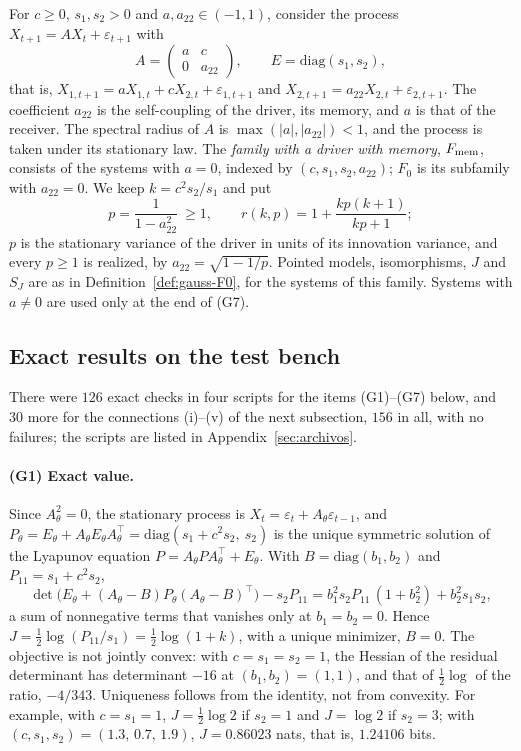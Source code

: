 \begin{definition}\label{def:gauss-Fmem}
For $c\ge0$, $s_1,s_2>0$ and $a,a_{22}\in(-1,1)$, consider the process $X_{t+1}=AX_t+\varepsilon_{t+1}$ with
\[
A=\begin{pmatrix}a&c\\0&a_{22}\end{pmatrix},\qquad E=\mathrm{diag}(s_1,s_2),
\]
that is, $X_{1,t+1}=aX_{1,t}+cX_{2,t}+\varepsilon_{1,t+1}$ and $X_{2,t+1}=a_{22}X_{2,t}+\varepsilon_{2,t+1}$. The coefficient $a_{22}$ is the self-coupling of the driver, its memory, and $a$ is that of the receiver. The spectral radius of $A$ is $\max(|a|,|a_{22}|)<1$, and the process is taken under its stationary law. The \emph{family with a driver with memory}, $F_{\rm mem}$, consists of the systems with $a=0$, indexed by $(c,s_1,s_2,a_{22})$; $F_0$ is its subfamily with $a_{22}=0$. We keep $k=c^2s_2/s_1$ and put
\[
p=\frac1{1-a_{22}^2}\ \ge1,\qquad r(k,p)=1+\frac{kp(k+1)}{kp+1};
\]
$p$ is the stationary variance of the driver in units of its innovation variance, and every $p\ge1$ is realized, by $a_{22}=\sqrt{1-1/p}$. Pointed models, isomorphisms, $J$ and $S_J$ are as in Definition~\ref{def:gauss-F0}, for the systems of this family. Systems with $a\ne0$ are used only at the end of (G7).
\end{definition}

\subsection{Exact results on the test bench}
There were $126$ exact checks in four scripts for the items (G1)--(G7) below, and $30$ more for the connections (i)--(v) of the next subsection, $156$ in all, with no failures; the scripts are listed in Appendix~\ref{sec:archivos}.

\paragraph{(G1) Exact value.} Since $A_\theta^2=0$, the stationary process is $X_t=\varepsilon_t+A_\theta\varepsilon_{t-1}$, and $P_\theta=E_\theta+A_\theta E_\theta A_\theta^\top=\mathrm{diag}(s_1+c^2s_2,\ s_2)$ is the unique symmetric solution of the Lyapunov equation $P=A_\theta PA_\theta^\top+E_\theta$. With $B=\mathrm{diag}(b_1,b_2)$ and $P_{11}=s_1+c^2s_2$,
\begin{equation}
\det\bigl(E_\theta+(A_\theta-B)P_\theta(A_\theta-B)^\top\bigr)-s_2P_{11}=b_1^2s_2P_{11}\,(1+b_2^2)+b_2^2s_1s_2 ,
\end{equation}
a sum of nonnegative terms that vanishes only at $b_1=b_2=0$. Hence $J=\tfrac12\log(P_{11}/s_1)=\tfrac12\log(1+k)$, with a unique minimizer, $B=0$. The objective is not jointly convex: with $c=s_1=s_2=1$, the Hessian of the residual determinant has determinant $-16$ at $(b_1,b_2)=(1,1)$, and that of $\tfrac12\log$ of the ratio, $-4/343$. Uniqueness follows from the identity, not from convexity. For example, with $c=s_1=1$, $J=\tfrac12\log2$ if $s_2=1$ and $J=\log2$ if $s_2=3$; with $(c,s_1,s_2)=(1.3,\,0.7,\,1.9)$, $J=0.86023$ nats, that is, $1.24106$ bits. \stS


